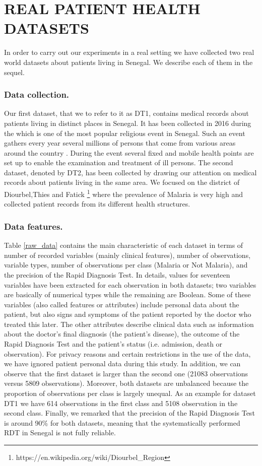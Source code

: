 \section{REAL PATIENT HEALTH DATASETS}\label{datasets}
In order to carry out  our experiments in a real setting we have collected two real world datasets about patients living in Senegal. We describe each of them in the sequel.

\subsubsection*{\textbf{Data collection.}} Our first dataset, that we  to refer to it as DT1, contains medical records about patients living in distinct places in Senegal. It has been collected in 2016 during the   which is one of the most popular religious event in Senegal. Such an event gathers every year several millions of persons that come from various areas around the country \cite{Ch17}.  During the event several fixed and mobile health points are set up to enable the examination and treatment of ill persons. The second dataset, denoted by DT2, has been collected by drawing our attention on medical records about patients living in the same area. We focused on the district of Diourbel,Thies and Fatick \footnote{https://en.wikipedia.org/wiki/Diourbel\_Region} where the prevalence of Malaria is very high and collected patient records from its different health structures. 

\subsubsection*{\textbf{Data features. }} Table \ref{raw_data} contains the main characteristic of each dataset in terms of number of recorded variables (mainly clinical features), number of observations, variable types, number of observations per class (Malaria or Not Malaria), and the precision of the Rapid Diagnosis Test. In details, values for seventeen variables have been extracted for each observation in both datasets; two variables are basically of numerical types while the remaining are Boolean. Some of these variables (also called features or attributes) include personal data about the patient, but also signs and symptoms of the patient reported by the doctor who treated this later. The other attributes describe clinical data such as information about the doctor's final diagnosis (the patient's disease), the outcome of the Rapid Diagnosis Test and the patient's status (i.e. admission, death or observation). For privacy reasons and certain restrictions in the use of the data, we have ignored patient personal data  during this study.
In addition, we can observe that the first dataset is larger than the second one (21083 observations versus 5809 observations). Moreover, both datasets are unbalanced because the proportion of observations per class is largely unequal. As an example for dataset DT1 we have 614 observations in the first class and 5108 observation in the second class. Finally, we remarked that the precision of the Rapid Diagnosis Test is around 90\% for both datasets, meaning that
the systematically performed RDT in Senegal is not fully reliable.

